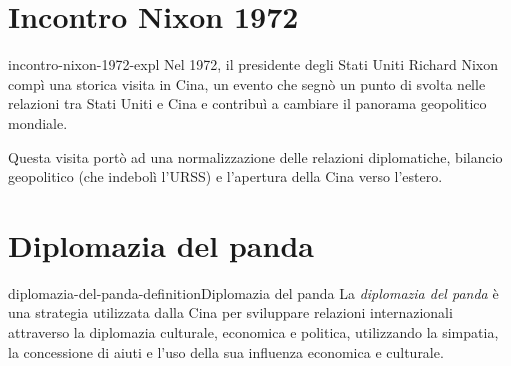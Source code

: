 \documentclass[preview]{standalone}
\begin{document}
\genpage

\section{Incontro Nixon 1972}

\begin{snippet}{incontro-nixon-1972-expl}
    Nel 1972, il presidente degli Stati Uniti Richard Nixon compì
    una storica visita in Cina, un evento che segnò un punto di svolta nelle
    relazioni tra Stati Uniti e Cina e contribuì a cambiare il panorama geopolitico mondiale.

    Questa visita portò ad una normalizzazione delle relazioni diplomatiche,
    bilancio geopolitico (che indebolì l'URSS) e l'apertura della Cina verso l'estero.
\end{snippet}

\section{Diplomazia del panda}

\begin{snippetdefinition}{diplomazia-del-panda-definition}{Diplomazia del panda}
    La \textit{diplomazia del panda} è una strategia utilizzata dalla Cina per sviluppare relazioni internazionali attraverso la diplomazia culturale, economica e politica, utilizzando la simpatia, la concessione di aiuti e l'uso della sua influenza economica e culturale.
\end{snippetdefinition}
\end{document}
